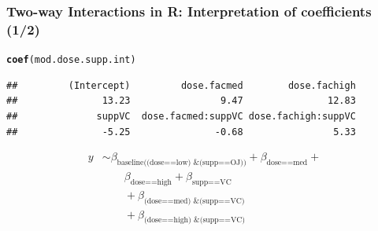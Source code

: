 \documentclass{beamer}\usepackage[]{graphicx}\usepackage[]{color}
\makeatletter
\newcommand{\hlstd}[1]{\textcolor[rgb]{0.345,0.345,0.345}{#1}}%
\newcommand{\hlkwd}[1]{\textcolor[rgb]{0.737,0.353,0.396}{\textbf{#1}}}%
\newenvironment{kframe}{%
 \def\at@end@of@kframe{}%
 \ifinner\ifhmode%
  \def\at@end@of@kframe{\end{minipage}}%
  \begin{minipage}{\columnwidth}%
 \fi\fi%
 \def\FrameCommand##1{\hskip\@totalleftmargin \hskip-\fboxsep
 \colorbox{shadecolor}{##1}\hskip-\fboxsep
     \hskip-\linewidth \hskip-\@totalleftmargin \hskip\columnwidth}%
 \MakeFramed {\advance\hsize-\width
   \@totalleftmargin\z@ \linewidth\hsize
   \@setminipage}}%
 {\par\unskip\endMakeFramed%
 \at@end@of@kframe}
\newenvironment{knitrout}{}{} %
\makeatother
\begin{document}
{{{
\begin{frame}[fragile]
\frametitle{Two-way Interactions in R: Interpretation of coefficients (1/2)}
\begin{knitrout}\tiny
{}\color{fgcolor}\begin{kframe}
\begin{alltt}
\hlkwd{coef}\hlstd{(mod.dose.supp.int)}
\end{alltt}
\begin{verbatim}
##         (Intercept)         dose.facmed        dose.fachigh 
##               13.23                9.47               12.83 
##              suppVC  dose.facmed:suppVC dose.fachigh:suppVC 
##               -5.25               -0.68                5.33
\end{verbatim}
\end{kframe}
\end{knitrout}
\begin{align*}
y & \sim \beta_{\text{baseline((dose==low) \& (supp==OJ))}} +
\beta_\text{dose==med} + \\
& \qquad \beta_\text{dose==high} + \beta_\text{supp==VC} \\
& \qquad + \beta_\text{(dose==med) \& (supp==VC)} \\
& \qquad + \beta_\text{(dose==high) \& (supp==VC)} \nonumber
\end{align*}
\end{frame}


}}}
\end{document}
